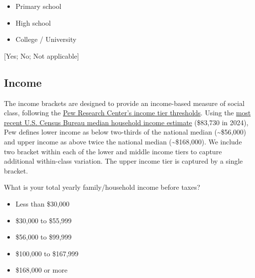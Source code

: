 \documentclass[
  letterpaper,
  DIV=11,
  numbers=noendperiod]{scrartcl}
\providecommand{\tightlist}{%
  \setlength{\itemsep}{0pt}\setlength{\parskip}{0pt}}
\begin{document}
\begin{itemize}
\tightlist
\item
  Primary school
\item
  High school
\item
  College / University
\end{itemize}

{[}Yes; No; Not applicable{]}

\subsection{Income}\label{income}

\begin{tcolorbox}[enhanced jigsaw, toprule=.15mm, toptitle=1mm, colframe=quarto-callout-note-color-frame, leftrule=.75mm, rightrule=.15mm, bottomtitle=1mm, coltitle=black, colbacktitle=quarto-callout-note-color!10!white, bottomrule=.15mm, breakable, opacityback=0, titlerule=0mm, title=\textcolor{quarto-callout-note-color}{\faInfo}\hspace{0.5em}{A note on the income categories}, left=2mm, arc=.35mm, opacitybacktitle=0.6, colback=white]

The income brackets are designed to provide an income-based measure of
social class, following the
\href{https://www.pewresearch.org/short-reads/2024/09/16/are-you-in-the-american-middle-class/}{Pew
Research Center's income tier thresholds}. Using the
\href{https://www.census.gov/library/publications/2025/demo/p60-286.html}{most
recent U.S. Census Bureau median household income estimate} (\$83,730 in
2024), Pew defines lower income as below two-thirds of the national
median (\textasciitilde\$56,000) and upper income as above twice the
national median (\textasciitilde\$168,000). We include two bracket
within each of the lower and middle income tiers to capture additional
within-class variation. The upper income tier is captured by a single
bracket.

\end{tcolorbox}

What is your total yearly family/household income before taxes?

\begin{itemize}
\tightlist
\item
  Less than \$30,000
\item
  \$30,000 to \$55,999
\item
  \$56,000 to \$99,999
\item
  \$100,000 to \$167,999
\item
  \$168,000 or more
\end{itemize}
\end{document}
